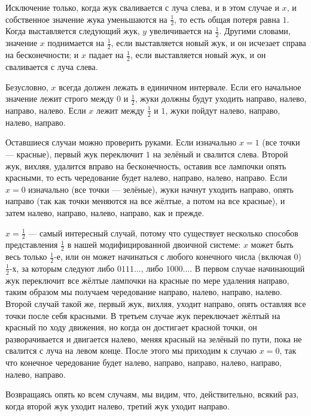 Исключение только, когда жук сваливается с луча слева, и в этом случае и $x$, и собственное значение жука уменьшаются на $\tfrac12$, то есть общая потеря равна $1$.
Когда выставляется следующий жук, $y$ увеличивается на $\tfrac12$.
Другими словами, значение $x$ поднимается на $\tfrac12$, если выставляется новый жук, и он исчезает справа на бесконечности; и $x$ падает на $\tfrac12$, если выставляется новый жук, и он сваливается с луча слева.

Безусловно, $x$ всегда должен лежать в единичном интервале.
Если его начальное значение лежит строго между $0$ и $\tfrac12$, жуки должны будут уходить направо, налево, направо, налево.
Если $x$ лежит между $\tfrac12$ и $1$, жуки пойдут налево, направо, налево, направо.

Оставшиеся случаи можно проверить руками.
Если изначально $x = 1$ (все точки --- красные), первый жук переключит $1$ на зелёный и свалится слева.
Второй жук, вихляя, удалится вправо на бесконечность, оставив все лампочки опять красными, то есть чередование будет налево, направо, налево, направо.
Если $x = 0$ изначально (все точки --- зелёные), жуки начнут уходить направо, опять направо (так как точки меняются на все жёлтые, а потом на все красные), и затем налево, направо, налево, направо, как и прежде.

$x=\tfrac12$ --- самый интересный случай, потому что существует несколько способов представления $\tfrac12$ в нашей модифицированной двоичной системе: $x$ может быть весь только $\tfrac12$-е, или он может начинаться с любого конечного числа (включая 0) $\tfrac12$-х, за которым следуют либо $0111\dots$, либо $1000\dots$.
В первом случае начинающий жук переключит все жёлтые лампочки на красные по мере удаления направо, таким образом мы получаем чередование направо, налево, направо, налево.
Второй случай такой же, первый жук, вихляя, уходит направо, опять оставляя все точки после себя красными.
В третьем случае жук переключает жёлтый на красный по ходу движения, но когда он достигает красной точки, он разворачивается и двигается налево, меняя красный на зелёный по пути, пока не свалится с луча на левом конце.
После этого мы приходим к случаю $x = 0$, так что конечное чередование будет налево, направо, направо, налево, направо, налево, направо.

Возвращаясь опять ко всем случаям, мы видим, что, действительно, всякий раз, когда второй жук уходит налево, третий жук уходит направо.
\heart

